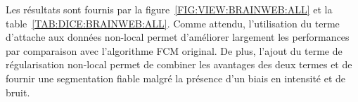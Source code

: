 Les résultats sont fournis par la figure~\ref{FIG:VIEW:BRAINWEB:ALL} et la table~\ref{TAB:DICE:BRAINWEB:ALL}.
Comme attendu, l'utilisation du terme d'attache aux données non-local permet d'améliorer largement les performances par comparaison avec l'algorithme FCM original.
De plus, l'ajout du terme de régularisation non-local permet de combiner les avantages des deux termes et de fournir une segmentation fiable malgré la présence d'un biais en intensité et de bruit.

\begin{figure}[!thbp]

        \begin{center}
	\\

\end{center}
\end{figure}
